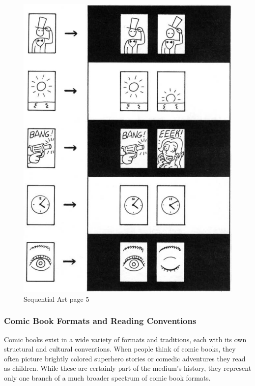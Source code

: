 \begin{figure}[!htp]
	\centering
	\includegraphics[scale=0.45]{images/SequentalArtUnderstandingComicPage5.png}
	\caption[Sequential Art]{Sequential Art page 5 \cite{mccloud1993understanding}}
	\label{fig:SequentialArt}
\end{figure}


\subsubsection{Comic Book Formats and Reading Conventions}

Comic books exist in a wide variety of formats and traditions, each with its own structural and cultural conventions. When people think of comic books, they often picture brightly colored superhero stories or comedic adventures they read as children. While these are certainly part of the medium's history, they represent only one branch of a much broader spectrum of comic book formats.

